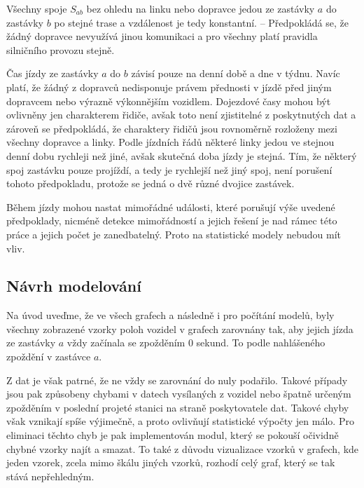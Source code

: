 \bigbreak


Všechny spoje $S_{ab}$ bez ohledu na linku nebo dopravce jedou ze zastávky $a$ do zastávky $b$ po stejné trase a vzdálenost je tedy konstantní. -- Předpokládá se, že žádný dopravce nevyužívá jinou komunikaci a pro všechny platí pravidla silničního provozu stejně.


\bigbreak


Čas jízdy ze zastávky $a$ do $b$ závisí pouze na denní době a dne v týdnu. Navíc platí, že žádný z dopravců nedisponuje právem přednosti v jízdě před jiným dopravcem nebo výrazně výkonnějším vozidlem.  Dojezdové časy mohou být ovlivněny jen charakterem řidiče, avšak toto není zjistitelné z poskytnutých dat a zároveň se předpokládá, že charaktery řidičů jsou rovnoměrně rozloženy mezi všechny dopravce a linky. Podle jízdních řádů některé linky jedou ve stejnou denní dobu rychleji než jiné, avšak skutečná doba jízdy je stejná. Tím, že některý spoj zastávku pouze projíždí, a tedy je rychlejší než jiný spoj, není porušení tohoto předpokladu, protože se jedná o dvě různé dvojice zastávek.


\bigbreak


Během jízdy mohou nastat mimořádné události, které porušují výše uvedené předpoklady, nicméně detekce mimořádností a jejich řešení je nad rámec této práce a jejich počet je zanedbatelný. Proto na statistické modely nebudou mít vliv.


\subsection{Návrh modelování} \label{subsubsection:analyza_dat}


Na úvod uveďme, že ve všech grafech a následně i pro počítání modelů, byly všechny zobrazené vzorky poloh vozidel v grafech zarovnány tak, aby jejich jízda ze zastávky $a$ vždy začínala se zpožděním 0 sekund. To podle nahlášeného zpoždění v zastávce $a$.


\bigbreak


Z dat je však patrné, že ne vždy se zarovnání do nuly podařilo. Takové případy jsou pak způsobeny chybami v datech vysílaných z vozidel nebo špatně určeným zpožděním v poslední projeté stanici na straně poskytovatele dat. Takové chyby však vznikají spíše výjimečně, a proto ovlivňují statistické výpočty jen málo. Pro eliminaci těchto chyb je pak implementován modul, který se pokouší očividně chybné vzorky najít a smazat. To také z důvodu vizualizace vzorků v grafech, kde jeden vzorek, zcela mimo škálu jiných vzorků, rozhodí celý graf, který se tak stává nepřehledným.


